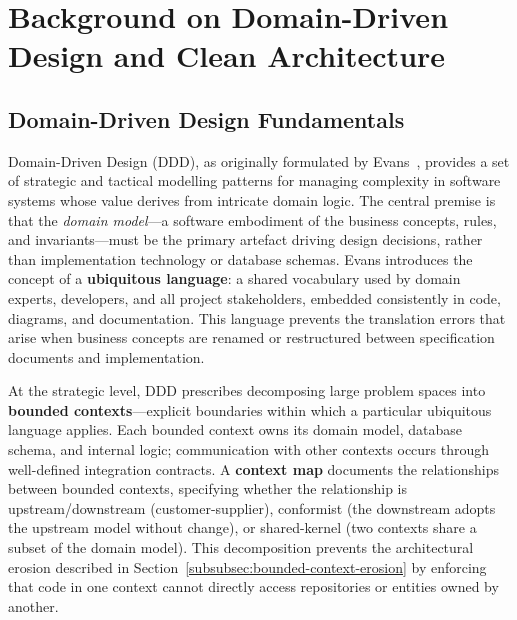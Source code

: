 
\section{Background on Domain-Driven Design and Clean Architecture}
\label{sec:ddd-clean-arch}

\subsection{Domain-Driven Design Fundamentals}

Domain-Driven Design (DDD), as originally formulated by Evans~\cite{evans2003ddd}, provides a set of strategic and tactical modelling patterns for managing complexity in software systems whose value derives from intricate domain logic. The central premise is that the \textit{domain model}---a software embodiment of the business concepts, rules, and invariants---must be the primary artefact driving design decisions, rather than implementation technology or database schemas. Evans introduces the concept of a \textbf{ubiquitous language}: a shared vocabulary used by domain experts, developers, and all project stakeholders, embedded consistently in code, diagrams, and documentation. This language prevents the translation errors that arise when business concepts are renamed or restructured between specification documents and implementation.

At the strategic level, DDD prescribes decomposing large problem spaces into \textbf{bounded contexts}---explicit boundaries within which a particular ubiquitous language applies. Each bounded context owns its domain model, database schema, and internal logic; communication with other contexts occurs through well-defined integration contracts. A \textbf{context map} documents the relationships between bounded contexts, specifying whether the relationship is upstream/downstream (customer-supplier), conformist (the downstream adopts the upstream model without change), or shared-kernel (two contexts share a subset of the domain model). This decomposition prevents the architectural erosion described in Section~\ref{subsubsec:bounded-context-erosion} by enforcing that code in one context cannot directly access repositories or entities owned by another.

